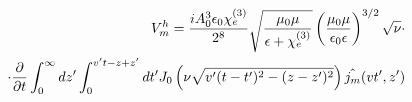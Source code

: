 %
%
%
%
%
%
\begin{equation} \begin{aligned} 
V_m^h = \frac{i A_0^3 \epsilon_0 \chi_e^{(3)}}{2^8}
\sqrt{\frac{\mu_0 \mu}{\epsilon + \chi_e^{(3)}}} 
\left( \frac{\mu_0 \mu}{\epsilon_0 \epsilon} \right)^{3/2} \sqrt{\nu} 
\cdot \\ \cdot \frac{\partial }{\partial t} \int_0^\infty dz' \int_0^{v't - z + z'} dt'
J_0 \left( \nu \sqrt{v'(t-t')^2 - (z-z')^2} \right) \hat{j_m} (vt',z')
\end{aligned} \end{equation}

